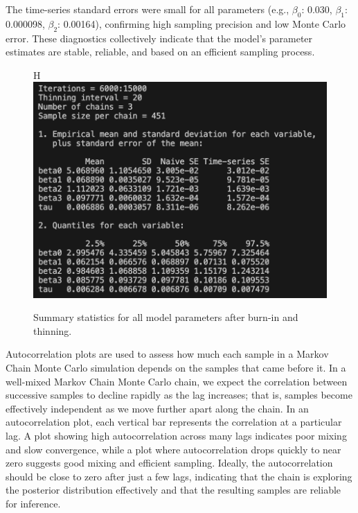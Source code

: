\documentclass[]{article}
\begin{document}
The time-series standard errors were small for all parameters (e.g., $\beta_0$: 0.030, $\beta_1$: 0.000098, $\beta_2$: 0.00164), confirming high sampling precision and low Monte Carlo error. These diagnostics collectively indicate that the model's parameter estimates are stable, reliable, and based on an efficient sampling process.


\begin{figure}{H}
	\centering
	\includegraphics[width=0.7\linewidth]{img/img-summary}
	\caption{Summary statistics for all model parameters after burn-in and thinning.}	
	\label{fig:img-summary}
\end{figure}


Autocorrelation plots are used to assess how much each sample in a Markov Chain Monte Carlo simulation depends on the samples that came before it. In a well-mixed Markov Chain Monte Carlo chain, we expect the correlation between successive samples to decline rapidly as the lag increases; that is, samples become effectively independent as we move further apart along the chain. In an autocorrelation plot, each vertical bar represents the correlation at a particular lag. A plot showing high autocorrelation across many lags indicates poor mixing and slow convergence, while a plot where autocorrelation drops quickly to near zero suggests good mixing and efficient sampling. Ideally, the autocorrelation should be close to zero after just a few lags, indicating that the chain is exploring the posterior distribution effectively and that the resulting samples are reliable for inference.
\end{document}
